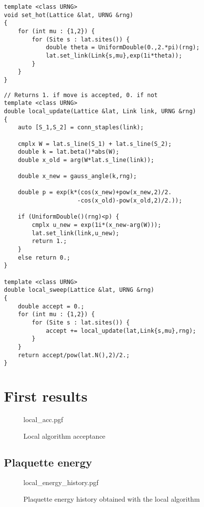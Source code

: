 \begin{lstlisting}[caption={Hot configuration}]
template <class URNG>
void set_hot(Lattice &lat, URNG &rng)
{
    for (int mu : {1,2}) {
        for (Site s : lat.sites()) {
            double theta = UniformDouble(0.,2.*pi)(rng);
            lat.set_link(Link{s,mu},exp(1i*theta));
        }
    }
}
\end{lstlisting}

\begin{lstlisting}[caption={Local algorithm}]
// Returns 1. if move is accepted, 0. if not
template <class URNG>
double local_update(Lattice &lat, Link link, URNG &rng)
{
    auto [S_1,S_2] = conn_staples(link);
    
    cmplx W = lat.s_line(S_1) + lat.s_line(S_2);
    double k = lat.beta()*abs(W);
    double x_old = arg(W*lat.s_line(link));
    
    double x_new = gauss_angle(k,rng);
    
    double p = exp(k*(cos(x_new)+pow(x_new,2)/2.
                     -cos(x_old)-pow(x_old,2)/2.));
    
    if (UniformDouble()(rng)<p) {
        cmplx u_new = exp(1i*(x_new-arg(W)));
        lat.set_link(link,u_new);
        return 1.;
    }
    else return 0.;
}

template <class URNG>
double local_sweep(Lattice &lat, URNG &rng)
{
    double accept = 0.;
    for (int mu : {1,2}) {
        for (Site s : lat.sites()) {
            accept += local_update(lat,Link{s,mu},rng);
        }
    }
    return accept/pow(lat.N(),2)/2.;
}
\end{lstlisting}

\section{First results}

\begin{figure}[!htb]
    \centering
    {local_acc.pgf}
    \caption{Local algorithm acceptance}
    \label{fig:local_acc}
\end{figure}

\subsection{Plaquette energy}

\begin{figure}[!htb]
    \centering
    {local_energy_history.pgf}
    \caption{Plaquette energy history obtained with the local algorithm}
    \label{fig:local_energy_history}
\end{figure}

